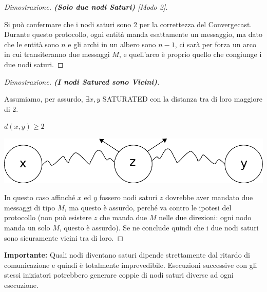 \begin{proof}[Dimostrazione. \textbf{(Solo due nodi Saturi)} \textit{[Modo 2]}]\

    Si può confermare che i nodi
    saturi sono 2 per la correttezza del Convergecast. Durante questo
    protocollo, ogni entità manda esattamente un messaggio, ma dato che le
    entità sono $n$ e gli archi in un albero sono $n-1$, ci sarà per forza
    un arco in cui transiteranno due messaggi $M$, e quell'arco è proprio
    quello che congiunge i due nodi saturi.
\end{proof}
\begin{proof}[Dimostrazione. \textbf{(I nodi Satured sono Vicini)}]\

    Assumiamo, per assurdo, $\exists x,y$ SATURATED con la
    distanza tra di loro maggiore di 2.
    \begin{center}
        $d(x,y) \geq 2$

        \includegraphics[scale=0.5]{capitoli/saturazione/imgs/n_41}
    \end{center}

    In questo caso affinché $x$ ed $y$ fossero nodi saturi $z$ dovrebbe
    aver mandato due messaggi di tipo $M$, ma questo è assurdo, perché va
    contro le ipotesi del protocollo (non può esistere $z$ che manda due $M$
    nelle due direzioni: ogni nodo manda un solo $M$, questo è assurdo). Se
    ne conclude quindi che i due nodi saturi sono sicuramente vicini tra
    di loro.
\end{proof}

\textbf{Importante:} Quali nodi diventano saturi dipende strettamente dal
ritardo di comunicazione e quindi è totalmente imprevedibile. Esecuzioni
successive con gli stessi iniziatori potrebbero generare coppie di nodi saturi
diverse ad ogni esecuzione.

